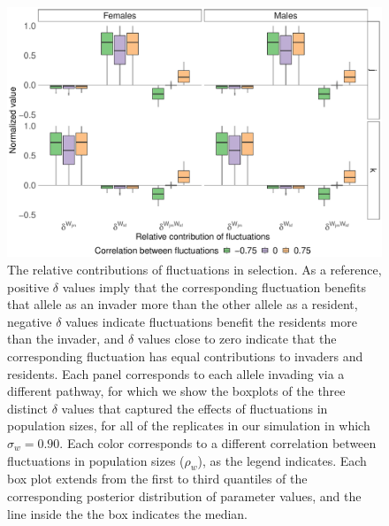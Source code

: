 \documentclass[12pt]{article}
\begin{document}
\begin{figure}[H]
  \centerline{\includegraphics[width=1\textwidth]{box_plots_selection.pdf}}
  \caption{ The relative contributions of fluctuations in selection. As a reference, positive $\delta$ values imply that the corresponding fluctuation benefits that allele as an invader more than the other allele as a resident, negative $\delta$ values indicate fluctuations benefit the residents more than the invader, and $\delta$ values close to zero indicate that the corresponding fluctuation has equal contributions to invaders and residents. Each panel corresponds to each allele invading via a different pathway, for which we show the boxplots of the three distinct $\delta$ values that captured the effects of fluctuations in population sizes, for all of the replicates in our simulation in which $\sigma_{w}=0.90$. Each color corresponds to a different correlation between fluctuations in population sizes ($\rho_{w}$), as the legend indicates. Each box plot extends from the first to third quantiles of the corresponding posterior distribution of parameter values, and the line inside the the box indicates the median.  }
    \label{fig:boxes_selection}
\end{figure}
\end{document}
